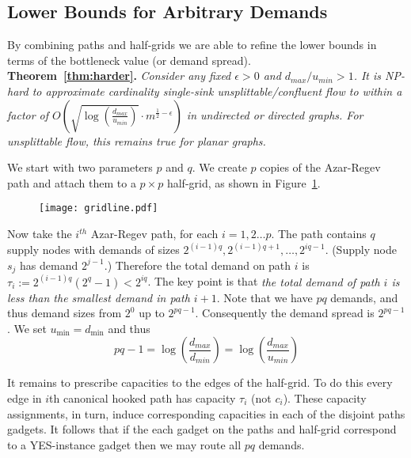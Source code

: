 \documentclass[12pt]{article}
\newcommand{\capp}[1]{c_{#1}}
\begin{document}
\subsection{Lower Bounds for Arbitrary Demands}\label{sec:refine}

By combining paths and half-grids we are able to refine the lower
bounds in terms of the bottleneck value (or demand spread).\\

{{\noindent\bf Theorem~\ref{thm:harder}.} \itshape
Consider any fixed $\epsilon > 0$ and  $d_{max}/u_{min} > 1$.
It is NP-hard to approximate cardinality single-sink unsplittable/confluent flow
to within a factor of $O(\sqrt{\log (\frac{d_{max}}{u_{min}})}\cdot m^{\frac12-\epsilon})$
in undirected or directed graphs. For unsplittable flow, this remains true for planar graphs.\\
}

We start with two parameters $p$ and $q$. We create $p$ copies of
the Azar-Regev path
 and attach them to a $p\times p$ half-grid, as shown in Figure~\ref{fig:gridline}.

\begin{figure}[h]
\begin{center}
\texttt{[image: gridline.pdf]}\\
\vspace{-2.5cm}
\caption{\label{fig:gridline}}
\end{center}
\end{figure}

 Now take the $i^{th}$ Azar-Regev path, for each $i=1,2 \ldots p$. The path
 contains $q$ supply nodes with demands of sizes $2^{(i-1)q},2^{(i-1)q+1},\ldots , 2^{iq-1}$. (Supply node $s_j$ has
 demand $2^{j-1}$.) Therefore the total demand on path $i$ is $\tau_i := 2^{(i-1)q}(2^q-1)<2^{iq}$. The key point is that
{\em the total demand of path $i$ is less than the smallest demand in path $i+1$}.
Note that we have $pq$ demands, and thus demand sizes from $2^{0}$ up to $2^{pq-1}$.
Consequently the demand spread is $2^{pq-1}$. We set $u_{\min}=d_{\min}$ and thus
$$pq-1 = \log\left(\frac{d_{max}}{d_{min}}\right) = \log\left(\frac{d_{max}}{u_{min}}\right)$$

 It remains to prescribe capacities to the edges of the half-grid.
To do this every edge in $i$th canonical hooked path has capacity $\tau_i$ (not $\capp{i}$). These capacity assignments,
in turn, induce corresponding capacities in each of the disjoint paths gadgets.
It follows that if the each gadget on the paths and half-grid correspond to a YES-instance gadget then we may
route all $pq$ demands.
\end{document}
